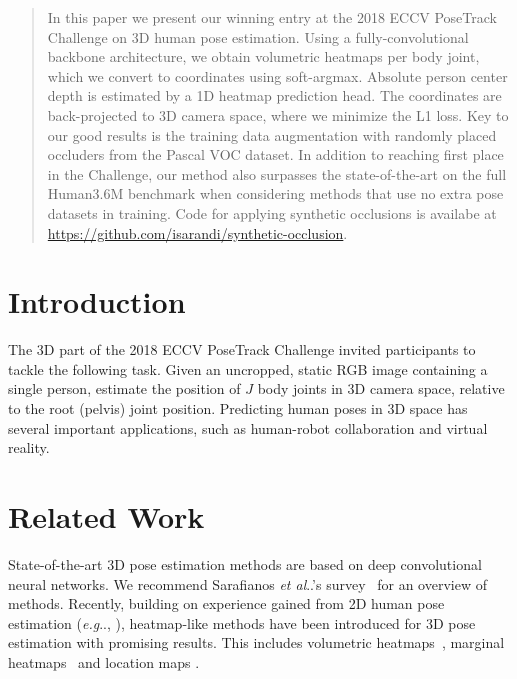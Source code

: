 \documentclass[10pt,twocolumn,letterpaper]{article}
\makeatletter
\DeclareRobustCommand\onedot{\futurelet\@let@token\@onedot}
\def\@onedot{\ifx\@let@token.\else.\null\fi\xspace}
\def\eg{\emph{e.g}\onedot} \def\Eg{\emph{E.g}\onedot}
\def\etal{\emph{et al}\onedot}
\newcommand{\PARbegin}[1]{\noindent {\bf #1~}}
\makeatother
\begin{document}
\maketitle
\begin{abstract}
In this paper we present our winning entry at the 2018 ECCV PoseTrack Challenge on 3D human pose estimation. Using a fully-convolutional backbone architecture, we obtain volumetric heatmaps per body joint, which we convert to coordinates using soft-argmax. Absolute person center depth is estimated by a 1D heatmap prediction head. The coordinates are back-projected to 3D camera space, where we minimize the L1 loss. Key to our good results is the training data augmentation with randomly placed occluders from the Pascal VOC dataset. In addition to reaching first place in the Challenge, our method also surpasses the state-of-the-art on the full Human3.6M benchmark when considering methods that use no extra pose datasets in training. Code for applying synthetic occlusions is availabe at \url{https://github.com/isarandi/synthetic-occlusion}.
\end{abstract}

\section{Introduction}

The 3D part of the 2018 ECCV PoseTrack Challenge invited participants to tackle the following task. Given an uncropped, static RGB image containing a single person, estimate the position of $J$ body joints in 3D camera space, relative to the root (pelvis) joint position.
Predicting human poses in 3D space has several important applications, such as human-robot collaboration and virtual reality. 

\section{Related Work}

\PARbegin{3D Human Pose Estimation.} State-of-the-art 3D pose estimation methods are based on deep convolutional neural networks. We recommend Sarafianos \etal's survey~\cite{Sarafianos16CVIU} for an overview of methods. Recently, building on experience gained from 2D human pose estimation (\eg, \cite{Newell16ECCV}), heatmap-like methods have been introduced for 3D pose estimation with promising results. This includes volumetric heatmaps~\cite{Pavlakos17CVPR}\cite{Sun18ECCV}\cite{Luvizon18CVPR}, marginal heatmaps~\cite{Nibali18arXiv2} and location maps \cite{Mehta17TOG}.
\end{document}
